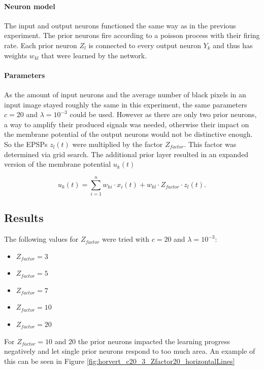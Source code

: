\paragraph{Neuron model}
The input and output neurons functioned the same way as in the previous experiment. The prior neurons fire according to a poisson process with their firing rate. Each prior neuron $Z_l$ is connected to every output neuron $Y_k$ and thus has weights $w_{kl}$ that were learned by the network. 

\paragraph{Parameters}
As the amount of input neurons and the average number of black pixels in an input image stayed roughly the same in this experiment, the same parameters $c=  20$ and $\lambda = 10^{-3}$ could be used. However as there are only two prior neurons, a way to amplify their produced signals was needed, otherwise their impact on the membrane potential of the output neurons would not be distinctive enough. So the EPSPs $z_l(t)$ were multiplied by the factor $Z_{factor}$. This factor was determined via grid search. The additional prior layer resulted in an expanded version of the membrane potential $u_k(t)$

\begin{equation}
\label{eqn:ukHorvert}
u_k(t) = \sum_{i=1}^n w_{ki} \cdot x_i(t) + w_{kl} \cdot Z_{factor} \cdot z_l(t).
\end{equation}

\subsection{Results} 

The following values for $Z_{factor} $ were tried with $c = 20$ and $\lambda = 10^{-3}$:
\begin{itemize}
  \item $Z_{factor} = 3$
  \item $Z_{factor} = 5$
  \item $Z_{factor} = 7$  
  \item $Z_{factor} = 10$ 
  \item $Z_{factor} = 20$
\end{itemize}

For $Z_{factor} = 10$ and $20$ the prior neurons impacted the learning progress negatively and let single prior neurons respond to too much area. An example of this can be seen in Figure \ref{fig:horvert_c20_3_Zfactor20_horizontalLines}

